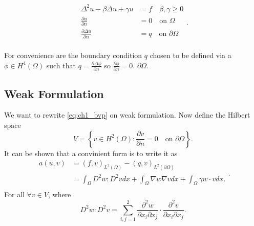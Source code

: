 \begin{equation}
\label{eq:ch1_bvp}
\begin{split}
    \Delta ^2 u - \beta \Delta u + \gamma u &= f \quad \beta , \gamma \ge 0 \\
    \frac{\partial u}{\partial  n}  &= 0 \quad \text{on }\Omega  \\
    \frac{\partial \Delta u}{\partial  n}  &= q \quad \text{on } \partial \Omega  \\
\end{split}
.\end{equation}

For convenience are the boundary condition $q$ chosen to be defined via a  $\phi \in H^{4}\left( \Omega  \right)$
such that $q = \frac{\partial \Delta \phi }{\partial  n} $ so $\frac{\partial \phi }{\partial  n}  = 0$.
$\partial \Omega $.


\subsection{Weak Formulation}%
\label{sub:weak_formulation}

We want to rewrite \eqref{eq:ch1_bvp} on weak formulation. Now define the Hilbert space \[
V = \left\{ v \in H^2\left( \Omega  \right): \frac{\partial v}{\partial  n}  = 0 \quad \text{on } \partial \Omega
\right\}.
\]
It can be shown \cite{gu2012c0} that a convinient form is to write it as
\begin{equation}
\label{eq:weakform}
    \begin{split}
a\left( u,v \right) &=  \left( f,v \right)_{L^2\left( \Omega  \right)}  - \left( q,v \right)_{L^2\left( \partial \Omega  \right)}  \\
& = \int_{\Omega }^{} D^2 w : D^2 v dx +  \int_{\Omega }^{} \nabla w \nabla v dx + \int_{\Omega }^{} \gamma w \cdot v dx
.\\
    \end{split}
.\end{equation}
For all $\forall v \in  V$, where \[
D^2 w : D^2 v = \sum_{i,j=1}^{2}  \frac{\partial ^2 w}{\partial x_{i} \partial x_{j} } \cdot  \frac{\partial ^2 v
}{\partial x_{i} \partial x_{j} }.
\]


